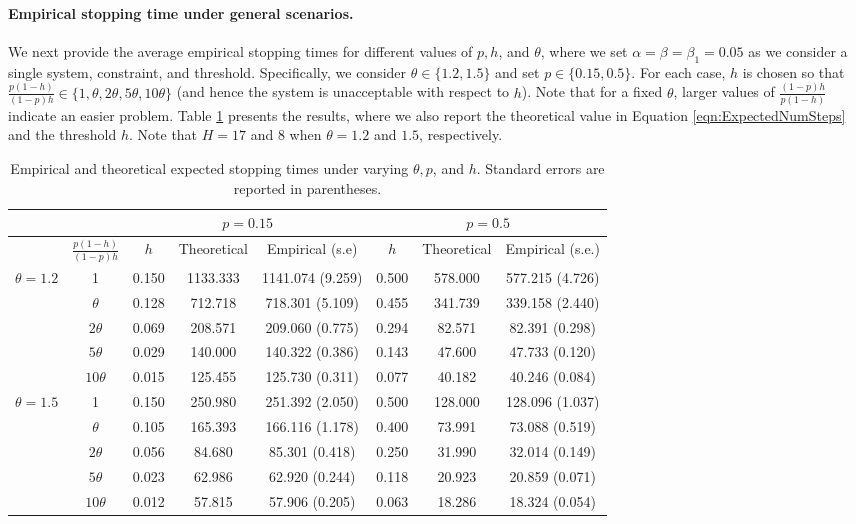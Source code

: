 \documentclass[11pt]{article}
\begin{document}
\paragraph{Empirical stopping time under general scenarios.}

We next provide the average empirical stopping times for different values of $p,h$, and $\theta$, where we set $\alpha=\beta=\beta_1=0.05$ as we consider a single system, constraint, and threshold. Specifically, we consider $\theta\in \{1.2, 1.5\}$ and set $p\in \{0.15, 0.5\}$. For each case, $h$ is chosen so that $\frac{p(1-h)}{(1-p)h}\in \{1, \theta, 2\theta, 5\theta, 10\theta \}$ (and hence the system is unacceptable with respect to $h$). Note that for a fixed $\theta$, larger values of $\frac{(1-p)h}{p(1-h)}$ indicate an easier problem. Table \ref{tab:EmpiricalStopping_General} presents the results, where we also report the theoretical value in Equation \eqref{eqn:ExpectedNumSteps} and the threshold $h$. Note that $H=17$ and 8 when $\theta=1.2$ and $1.5$, respectively. 

\begin{table}[h!]
    \centering
    \renewcommand{\arraystretch}{0.8}
    \begin{tabular}{c||c|ccc||ccc}
        \toprule
         & & \multicolumn{3}{c||}{$p=0.15$} & \multicolumn{3}{c}{$p=0.5$} \\   \midrule
        & $\frac{p(1-h)}{(1-p)h}$ & $h$ & Theoretical & Empirical (s.e) & $h$ & Theoretical & Empirical (s.e.)  \\  \hline
        \multirow{ 5}{*}{$\theta=1.2$} & 1 & 0.150 & 1133.333 & 1141.074 (9.259) & 0.500 & 578.000 & 577.215 (4.726) \\
        & $\theta$ & 0.128 & 712.718 & 718.301 (5.109) & 0.455 & 341.739 & 339.158 (2.440) \\
         & $2\theta$ & 0.069 & 208.571 & 209.060 (0.775) & 0.294 & 82.571 & 82.391 (0.298) \\
         & $5\theta$ & 0.029 & 140.000 & 140.322 (0.386) & 0.143 & 47.600 & 47.733 (0.120) \\  
         & $10\theta$ & 0.015 & 125.455 & 125.730 (0.311) & 0.077 & 40.182 & 40.246 (0.084) \\ \hline
         \multirow{ 5}{*}{$\theta=1.5$} & 1 & 0.150 & 250.980 & 251.392 (2.050) & 0.500 & 128.000 & 128.096 (1.037) \\
         & $\theta$ & 0.105 & 165.393 & 166.116 (1.178) & 0.400 & 73.991 & 73.088 (0.519) \\
         & $2\theta$ & 0.056 & 84.680 & 85.301 (0.418) & 0.250 & 31.990 & 32.014 (0.149)  \\
         & $5\theta$ & 0.023 & 62.986 & 62.920 (0.244) & 0.118 & 20.923 & 20.859 (0.071) \\
         & $10\theta$ & 0.012 & 57.815 & 57.906 (0.205) & 0.063 & 18.286 & 18.324 (0.054) \\
         \bottomrule
    \end{tabular}
    \caption{Empirical and theoretical expected stopping times under varying $\theta,p$, and $h$. Standard errors are reported in parentheses.}
    \label{tab:EmpiricalStopping_General}
\end{table}
\end{document}
